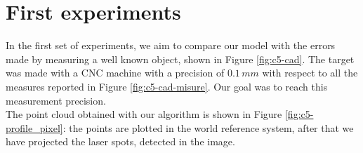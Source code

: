 \section{First experiments}
\label{sec:exp1}

In the first set of experiments, we aim to compare our model with the errors made by measuring a well known object, shown in Figure \ref{fig:c5-cad}. The target was made with a \acs{CNC} machine with a precision of $0.1 \, mm$ with respect to all the measures reported in Figure \ref{fig:c5-cad-misure}. Our goal was to reach this measurement precision. \\

The point cloud obtained with our algorithm is shown in Figure \ref{fig:c5-profile_pixel}: the points are plotted in the world reference system, after that we have projected the laser spots, detected in the image.


